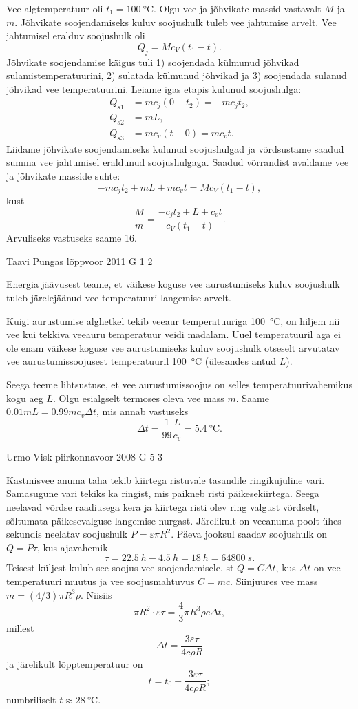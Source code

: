 \documentclass[11pt]{article}
\begin{document}
{{\ifSolution
Vee algtemperatuur oli $t_1=\SI{100}{\celsius}$. Olgu vee ja jõhvikate massid vastavalt $M$ ja $m$. Jõhvikate soojendamiseks kuluv soojushulk tuleb vee jahtumise arvelt. Vee jahtumisel eralduv soojushulk oli
\[
Q_j=Mc_V(t_1-t).
\]
Jõhvikate soojendamise käigus tuli 1) soojendada külmunud jõhvikad sulamistemperatuurini, 2) sulatada külmunud jõhvikad ja 3) soojendada sulanud jõhvikad vee temperatuurini.
Leiame igas etapis kulunud soojushulga:
\[
\begin{aligned}
Q_{s1}&=mc_j(0-t_2)=-mc_jt_2,\\
Q_{s2}&=mL,\\
Q_{s3}&=mc_v(t-0)=mc_vt.
\end{aligned}
\]
Liidame jõhvikate soojendamiseks kulunud soojushulgad ja võrdsustame saadud summa vee jahtumisel eraldunud soojushulgaga. Saadud võrrandist avaldame vee ja jõhvikate masside suhte:
\[
-mc_jt_2+mL+mc_vt=Mc_V(t_1-t),
\]
kust
\[
\frac{M}{m}=\frac{-c_jt_2+L+c_vt}{c_V(t_1-t)}.
\]
Arvuliseks vastuseks saame \num{16}.
\fi
}

{Taavi Pungas} %
{lõppvoor} %
{2011} %
{G 1} %
{2} %
{

\ifSolution
Energia jäävusest teame, et väikese koguse vee aurustumiseks kuluv soojushulk tuleb järelejäänud vee temperatuuri langemise arvelt.

Kuigi aurustumise alghetkel tekib veeaur temperatuuriga \SI{100}{\celsius}, on hiljem nii vee
kui tekkiva veeauru temperatuur veidi madalam. Uuel temperatuuril aga ei ole enam
väikese koguse vee aurustumiseks kuluv soojushulk otseselt arvutatav vee aurustumissoojusest temperatuuril \SI{100}{\celsius} (ülesandes antud $L$).

Seega teeme lihtsustuse, et vee aurustumissoojus on selles temperatuurivahemikus kogu aeg $L$. Olgu esialgselt termoses oleva vee mass $m$. Saame $\num{0,01}mL = \num{0,99}mc_v\Delta t$, mis annab vastuseks
\[
\Delta t=\frac{1}{99} \frac{L}{c_{v}}=\SI{5,4}{\celsius}.
\]
\fi
}

{Urmo Visk} %
{piirkonnavoor} %
{2008} %
{G 5} %
{3} %
{

\ifSolution
Kastmisvee anuma taha tekib kiirtega ristuvale tasandile ringikujuline vari. Samasugune vari tekiks ka ringist, mis paikneb risti päikesekiirtega. Seega neelavad võrdse raadiusega kera ja kiirtega risti olev ring valgust võrdselt, sõltumata päikesevalguse langemise nurgast. Järelikult on veeanuma poolt ühes sekundis neelatav soojushulk $P = \varepsilon \pi R^2$. Päeva jooksul saadav soojushulk on $Q = P \tau$, kus ajavahemik
\[
\tau = \SI{22,5}{h} - \SI{4,5}{h} = \SI{18}{h} = \SI{64800}{s}.
\]
Teisest küljest kulub see soojus vee soojendamisele, st $Q = C\Delta t$, kus $\Delta t$ on vee temperatuuri muutus ja vee soojusmahtuvus $C = mc$. Siinjuures vee mass $m = (4/3) \pi R^3\rho$. Niisiis 
\[
\pi R^2 \cdot \varepsilon \tau = \frac 43 \pi R^3\rho c\Delta t,
\]
millest
\[
\Delta t = \frac{3\varepsilon \tau}{4c\rho R}
\]
ja järelikult lõpptemperatuur on
\[
t = t_0 + \frac{3\varepsilon \tau}{4c\rho R};
\]
numbriliselt $t \approx \SI{28}{\celsius}$.
\fi
}

}
\end{document}
